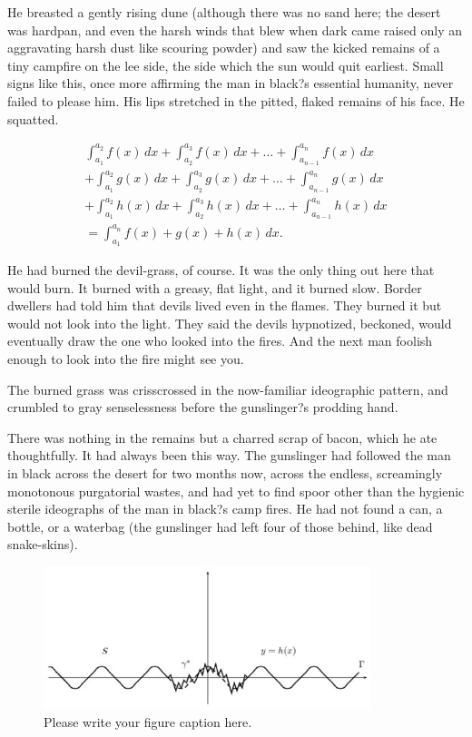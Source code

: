 \documentclass[
11pt,%
tightenlines,%
twoside,%
onecolumn,%
nofloats,%
nobibnotes,%
nofootinbib,%
superscriptaddress,%
noshowpacs,%
centertags]%
{revtex4}
\begin{document}
He breasted a gently rising dune (although there was no sand here; the desert was hardpan, and even the harsh winds that blew when dark came raised only an aggravating harsh dust like scouring powder) and saw the kicked remains of a tiny campfire on the lee side, the side which the sun would quit earliest. Small signs like this, once more affirming the man in black?s essential humanity, never failed to please him. His lips stretched in the pitted, flaked remains of his face. He squatted.

\begin{multline}
\int_{a_1}^{a_2} f(x)\,dx+\int_{a_2}^{a_3} f(x)\,dx
+\dots+\int_{a_{n-1}}^{a_n} f(x)\,dx\\
+\int_{a_1}^{a_2} g(x)\,dx+\int_{a_2}^{a_3} g(x)\,dx
+\dots+\int_{a_{n-1}}^{a_n} g(x)\,dx\\
+\int_{a_1}^{a_2} h(x)\,dx+\int_{a_2}^{a_3} h(x)\,dx
+\dots+\int_{a_{n-1}}^{a_n} h(x)\,dx\\
=\int_{a_1}^{a_n} f(x)+g(x)+h(x)\,dx.
\end{multline}

He had burned the devil-grass, of course. It was the only thing out here that would burn. It burned with a greasy, flat light, and it burned slow. Border dwellers had told him that devils lived even in the flames. They burned it but would not look into the light. They said the devils hypnotized, beckoned, would eventually draw the one who looked into the fires. And the next man foolish enough to look into the fire might see you.

The burned grass was crisscrossed in the now-familiar ideographic pattern, and crumbled to gray senselessness before the gunslinger?s prodding hand. 

There was nothing in the remains but a charred scrap of bacon, which he ate thoughtfully. It had always been this way. The gunslinger had followed the man in black across the desert for two months now, across the endless, screamingly monotonous purgatorial wastes, and had yet to find spoor other than the hygienic sterile ideographs of the man in black?s camp fires. He had not found a can, a bottle, or a waterbag (the gunslinger had left four of those behind, like dead snake-skins).

\begin{figure}[h]
\setcaptionmargin{5mm}
\onelinecaptionstrue  %
\includegraphics[width=0.85\textwidth]{deform.eps}
\caption{Please write your figure caption here.}\label{fig:1}
\end{figure}
\end{document}

